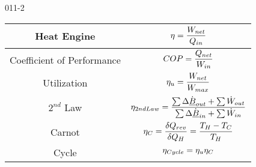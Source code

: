 \begin{mitframe}{011-2}

    
    \begin{longtable}{|c|c|}
	\hline
    Heat Engine & $\heateffic=\dfrac{\work_{net}}{\heatflow_{in}}$ \\ \hline
    Coefficient of Performance & $COP = \dfrac{\heatflow_{net}}{\work_{in}}$\\ \hline
    Utilization & $\heateffic_{\forcepot}=\dfrac{\work_{net}}{\work_{max}}$\\ \hline
    $2^{nd}$ Law & $\heateffic_{2nd Law}=\dfrac{\sum\iipf\dot{\uline{\exergy}}_{out}+\sum\dot{\work}_{out}}{\sum\iipf\dot{\uline{\exergy}}_{in}+\sum\dot{\work}_{in}}$\\ \hline
    Carnot & $\heateffic_{\conc}=\dfrac{\delta\heatflow_{rev}}{\delta\heatflow_{\enthalpy}}=\dfrac{\Temp_{\enthalpy}-\Temp_{\conc}}{\Temp_{\enthalpy}}$\\ \hline
    Cycle & $\heateffic_{Cycle}=\heateffic_{\forcepot}\heateffic_{\conc}$\\ \hline
	\end{longtable}

\end{mitframe}